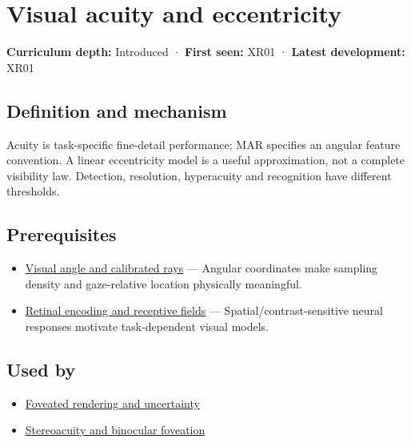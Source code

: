 \hypertarget{appendix-b491fc48c54b}{}\label{referencestart:appendix-b491fc48c54b}
\section{Visual acuity and eccentricity}\label{appendix-b491fc48c54b-visual-acuity-and-eccentricity}

\textbf{Curriculum depth:} Introduced · \textbf{First seen:} XR01 · \textbf{Latest development:} XR01

\subsection{Definition and mechanism}\label{appendix-b491fc48c54b-definition-and-mechanism}

Acuity is task-specific fine-detail performance; MAR specifies an angular feature convention. A linear eccentricity model is a useful approximation, not a complete visibility law. Detection, resolution, hyperacuity and recognition have different thresholds.

\subsection{Prerequisites}\label{appendix-b491fc48c54b-prerequisites}

\begin{itemize}
\tightlist
\item
  \hyperref[appendix-7d356c396d1a]{Visual angle and calibrated rays} --- Angular coordinates make sampling density and gaze-relative location physically meaningful.
\item
  \hyperref[appendix-7281c15ac44a]{Retinal encoding and receptive fields} --- Spatial/contrast-sensitive neural responses motivate task-dependent visual models.
\end{itemize}

\subsection{Used by}\label{appendix-b491fc48c54b-used-by}

\begin{itemize}
\tightlist
\item
  \hyperref[appendix-5878b813b732]{Foveated rendering and uncertainty}
\item
  \hyperref[appendix-8dc848f14052]{Stereoacuity and binocular foveation}
\end{itemize}

